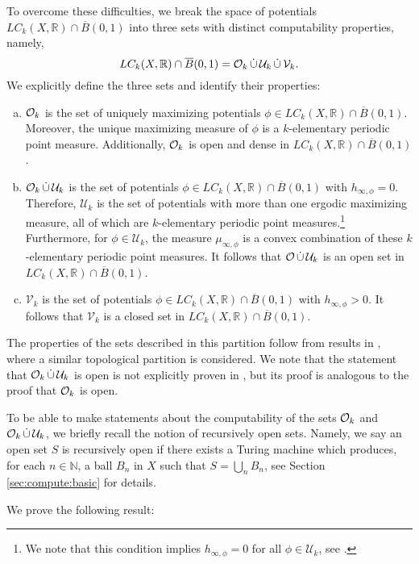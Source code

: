 \documentclass[11pt, reqno]{amsart}
\newcommand{\bR}{{\mathbb R}}
\newcommand{\bN}{{\mathbb N}}
\newcommand{\cU}{{\mathcal U}}
\newcommand{\cV}{{\mathcal V}}
\begin{document}
To overcome these difficulties, we break the space of potentials $LC_k(X,\mathbb{R})\cap \overline{B}(0,1)$ into three sets with distinct computability properties, namely,
\begin{equation}\label{eq:decompositionk}
LC_k(X,\bR)\cap \overline{B}(0,1)=\cO_k\, \dot\cup\,  \cU_k\, \dot\cup\, \cV_k.
\end{equation}
We explicitly define the three sets and identify their properties:
\begin{enumerate}[(a)]
\item $\mathcal O_k$ is the set of uniquely maximizing potentials $\phi\in LC_k(X,\bR)\cap \overline{B}(0,1)$. Moreover, the unique maximizing  measure of $\phi$ is a $k$-elementary periodic point measure.  Additionally, $\mathcal O_k$ is open and dense in $LC_k(X,\bR)\cap\overline{B}(0,1)$.
\item $\cO_k\,\dot\cup\,\cU_k$ is the set of potentials $\phi\in LC_k(X,\bR)\cap \overline{B}(0,1)$ with $h_{\infty,\phi}=0$.  Therefore, $\cU_k$ is the set of potentials with more than one ergodic maximizing measure, all of which are  $k$-elementary periodic point measures.\footnote{We note that this condition implies $h_{\infty,\phi}=0$ for all $\phi \in \cU_k$, see \cite{WY}.} 
Furthermore, for $\phi\in \cU_k$, the measure $\mu_{\infty,\phi}$ is a convex combination of these $k$-elementary periodic point measures.  It follows that $\cO\,\dot\cup\,\cU_k$ is an open set in $LC_k(X,\bR)\cap\overline{B}(0,1)$.
\item $\cV_k$ is the set of potentials $\phi\in LC_k(X,\bR)\cap \overline{B}(0,1)$ with $h_{\infty,\phi}>0$.  It follows that $\cV_k$ is a closed set in $LC_k(X,\bR)\cap\overline{B}(0,1)$.
\end{enumerate}
The properties of the sets described in this partition follow from results in \cite{WY}, where a similar topological partition is considered. We note that  the statement that $\cO_k\,\dot\cup\,\cU_k$ is open is not explicitly proven in \cite{WY}, but its proof
 is analogous to the proof that $\mathcal O_k$ is open.

To be able to make statements about the computability of the sets $\mathcal O_k$ and $\cO_k\,\dot\cup\, \cU_k$, we briefly recall the notion of recursively open sets.  Namely, we say an open set $S$ 
is recursively open if there exists a Turing machine which produces, for each $n\in \bN$, a ball $B_n$ in $X$ such that $S=\bigcup_n B_n$, see Section \ref{sec:compute:basic} for details.

We prove the following result:
\end{document}
